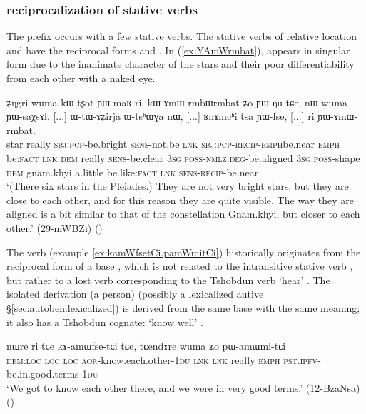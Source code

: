\subsubsection{ reciprocalization of stative verbs} \label{sec:amW.stative}
The  prefix occurs with a few stative verbs. The stative verbs of relative location  and   have the reciprocal forms   and . In (\ref{ex:YAmWrmbat}),  appears in singular form due to the inanimate character of the stars and their poor differentiability from each other with a naked eye.

\begin{exe}
\ex \label{ex:YAmWrmbat}
\gll ʑŋgri wuma kɯ-tʂot ɲɯ-maʁ ri, kɯ-ɤmɯ-rmbɯ\redp{}rmbat ʑo ɲɯ-ŋu tɕe, nɯ wuma ɲɯ-saχsɤl. [...] ɯ-tɯ-ɤʑirja ɯ-tsʰɯɣa nɯ, [...] ʁnɤmcʰi tsa ɲɯ-fse, [...] ri ɲɯ-ɤmɯ-rmbat. \\
star really  \textsc{sbj}:\textsc{pcp}-be.bright \textsc{sens}-not.be \textsc{lnk} \textsc{sbj}:\textsc{pcp}-\textsc{recip}-\textsc{emph}\redp{}be.near \textsc{emph} be:\textsc{fact} \textsc{lnk} \textsc{dem} really \textsc{sens}-be.clear { } \textsc{3sg}.\textsc{poss}-\textsc{nmlz}:\textsc{deg}-be.aligned \textsc{3sg}.\textsc{poss}-shape \textsc{dem} {  } gnam.khyi a.little be.like:\textsc{fact} {  } \textsc{lnk} \textsc{sens}-\textsc{recip}-be.near \\
\glt `(There six stars in the Pleiades.) They are not very bright stars, but they are close to each other, and for this reason they are quite visible. The way they are aligned is a bit similar to that of the constellation Gnam.khyi, but closer to each other.' (29-mWBZi)
()
\end{exe}

The verb  (example \ref{ex:kamWfsetCi.pamWmitCi}) historically originates from the  reciprocal form of a base , which is not related to the intransitive stative verb , but rather to a lost verb corresponding to the Tshobdun verb  `hear' \citep[213]{jackson19tshobdun}. The isolated derivation  (a person) (possibly a lexicalized autive §\ref{sec:autoben.lexicalized}) is derived from the same base with the same meaning; it also has a Tshobdun cognate:  `know well' \citep[121]{jackson19tshobdun}.

\begin{exe}
\ex \label{ex:kamWfsetCi.pamWmitCi}
\gll  nɯre ri tɕe kɤ-amɯfse-tɕi tɕe, tɕendɤre wuma ʑo pɯ-amɯmi-tɕi \\
\textsc{dem}:\textsc{loc} \textsc{loc} \textsc{loc} \textsc{aor}-know.each.other-\textsc{1du} \textsc{lnk} \textsc{lnk} really \textsc{emph} \textsc{pst}.\textsc{ipfv}-be.in.good.terms-\textsc{1du} \\
\glt  `We got to know each other there, and we were in very good terms.' (12-BzaNsa) ()
\end{exe}

